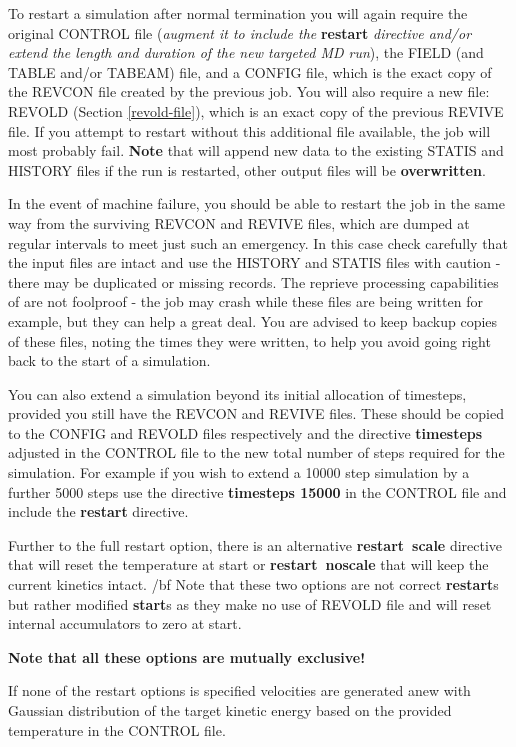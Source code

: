 To restart a simulation after normal termination you will again
require the original CONTROL file ({\em augment it to include the}
{\bf restart} {\em directive and/or extend the length and duration
of the new targeted MD run}), the FIELD (and TABLE and/or TABEAM)
file, and a CONFIG file, which is the exact copy of the REVCON file
created by the previous job.  You will also require a new file:
REVOLD (Section \ref{revold-file}), which is an exact copy of the
previous REVIVE file.  If you attempt to restart \D without this
additional file available, the job will most probably fail.
{\bf Note} that \D will append new data to the existing STATIS and
HISTORY files if the run is restarted, other output files will be
{\bf overwritten}.

In the event of machine failure, you should be able to restart the
job in the same way from the surviving REVCON and REVIVE files,
which are dumped at regular intervals to meet just such an
emergency.  In this case check carefully that the input files are
intact and use the HISTORY and STATIS files with caution - there
may be duplicated or missing records.  The reprieve processing
capabilities of \D are not foolproof - the job may crash while
these files are being written for example, but they can help a
great deal.  You are advised to keep backup copies of these files,
noting the times they were written, to help you avoid going right
back to the start of a simulation.

You can also extend a simulation beyond its initial allocation of
timesteps, provided you still have the REVCON and REVIVE files.
These should be copied to the CONFIG and REVOLD files respectively
and the directive {\bf timesteps} adjusted in the CONTROL file to
the new total number of steps required for the simulation.  For
example if you wish to extend a 10000 step simulation by a further
5000 steps use the directive {\bf timesteps 15000} in the CONTROL
file and include the {\bf restart} directive.

Further to the full restart option, there is an alternative
{\bf restart~scale} directive that will reset the temperature
at start or {\bf restart~noscale} that will keep the current
kinetics intact. {/bf Note} that these two options are not
correct {\bf restart}s but rather modified {\bf start}s as
they make no use of REVOLD file and will reset internal
accumulators to zero at start.

{\bf Note that all these options are mutually exclusive!}

If none of the restart options is specified velocities are
generated anew with Gaussian distribution of the target kinetic
energy based on the provided temperature in the CONTROL file.

